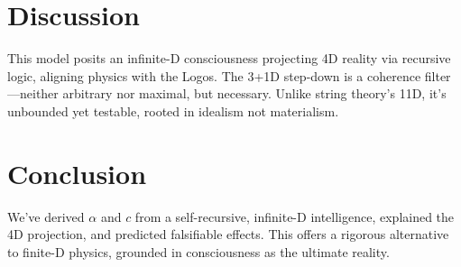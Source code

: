\documentclass[12pt]{article}
\begin{document}
\section{Discussion}

This model posits an infinite-D consciousness projecting 4D reality via recursive logic, aligning physics with the Logos. The 3+1D step-down is a coherence filter—neither arbitrary nor maximal, but necessary. Unlike string theory’s 11D, it’s unbounded yet testable, rooted in idealism not materialism.

\section{Conclusion}

We’ve derived \(\alpha\) and \(c\) from a self-recursive, infinite-D intelligence, explained the 4D projection, and predicted falsifiable effects. This offers a rigorous alternative to finite-D physics, grounded in consciousness as the ultimate reality.
\end{document}
